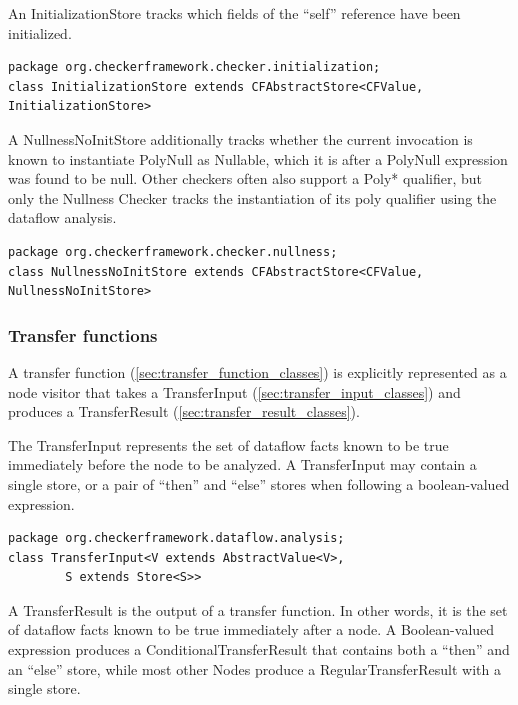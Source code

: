 An InitializationStore tracks which fields of the ``self'' reference
have been initialized.

\begin{verbatim}
package org.checkerframework.checker.initialization;
class InitializationStore extends CFAbstractStore<CFValue, InitializationStore>
\end{verbatim}

A NullnessNoInitStore additionally tracks whether the current
invocation is known to instantiate PolyNull as Nullable, which it is
after a PolyNull expression was found to be null.  Other checkers
often also support a Poly* qualifier, but only the Nullness Checker
tracks the instantiation of its poly qualifier using the dataflow
analysis.

\begin{verbatim}
package org.checkerframework.checker.nullness;
class NullnessNoInitStore extends CFAbstractStore<CFValue, NullnessNoInitStore>
\end{verbatim}


\subsubsection{Transfer functions}
\label{sec:transfer_functions}

A transfer function (\autoref{sec:transfer_function_classes}) is
explicitly represented as a node visitor that takes a TransferInput
(\autoref{sec:transfer_input_classes}) and produces a TransferResult
(\autoref{sec:transfer_result_classes}).

\label{sec:transfer_input_classes}

The TransferInput represents the set of dataflow facts known to be
true immediately before the node to be analyzed.  A TransferInput may
contain a single store, or a pair of ``then'' and ``else'' stores when
following a boolean-valued expression.

\begin{verbatim}
package org.checkerframework.dataflow.analysis;
class TransferInput<V extends AbstractValue<V>,
        S extends Store<S>>
\end{verbatim}

\label{sec:transfer_result_classes}

A TransferResult is the output of a transfer function.  In other
words, it is the set of dataflow facts known to be true immediately
after a node.  A Boolean-valued expression produces a
ConditionalTransferResult that contains both a ``then'' and an ``else''
store, while most other Nodes produce a RegularTransferResult with a
single store.

